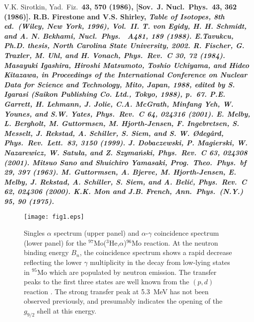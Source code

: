 \begin{multicols}{2}
\begin{references}
V.K. Sirotkin, Yad.\ Fiz.\ \bf 43\rm, 570 (1986), [Sov.\ J. 
Nucl.\ Phys.\ \bf 43\rm, 362 (1986)].
R.B. Firestone and V.S. Shirley, \sl Table of Isotopes\rm, 8th 
ed.\ (Wiley, New York, 1996), Vol.\ II.
T. von Egidy, H. H. Schmidt, and A. N. Bekhami, Nucl.\ Phys.\ \bf
A481\rm, 189 (1988).
E.Tavukcu, Ph.D. thesis, North Carolina State University, 2002.
R. Fischer, G. Traxler, M. Uhl, and H. Vonach, Phys.\ Rev.\ C \bf
30\rm, 72 (1984).
Masayuki Igashira, Hiroshi Matsumoto, Toshio Uchiya\-ma, and 
Hideo Kitazawa, in \sl Proceedings of the International Conference on Nuclear 
Data for Science and Technology\rm, Mito, Japan, 1988, edited by S. Igarasi 
(Saikon Publishing Co. Ltd., Tokyo, 1988), p.\ 67.
P.E. Garrett, H. Lehmann, J. Jolie, C.A. McGrath, Minfang Yeh, W.
Younes, and S.W. Yates, Phys.\ Rev.\ C \bf 64\rm, 024316 (2001).
E. Melby, L. Bergholt, M. Guttormsen, M. Hjorth-Jensen, F. 
Ingebretsen, S. Messelt, J. Rekstad, A. Schiller, S. Siem, and S. W. 
{\O}deg{\aa}rd, Phys.\ Rev.\ Lett.\ \bf 83\rm, 3150 (1999).
J. Dobaczewski, P. Magierski, W. Nazarewicz, W. Satu{\l}a, and Z.
Szyma{\'n}ski, Phys.\ Rev.\ C \bf 63\rm, 024308 (2001).
Mitsuo Sano and Shuichiro Yamasaki, Prog.\ Theo.\ Phys.\ bf 
29\rm, 397 (1963).
M. Guttormsen, A. Bjerve, M. Hjorth-Jensen, E. Melby, J. Rekstad,
A. Schiller, S. Siem, and A. Beli{\'c}, Phys.\ Rev.\ C \bf 62\rm, 024306 
(2000).
K.K. Mon and J.B. French, Ann.\ Phys.\ (N.Y.) \bf 95\rm, 90 
(1975).




\end{references}

\end{multicols}

\clearpage

\begin{figure}\centering
\texttt{[image: fig1.eps]}
\caption{Singles $\alpha$ spectrum (upper panel) and $\alpha$-$\gamma$ 
coincidence spectrum (lower panel) for the $^{97}$Mo($^3$He,$\alpha$)$^{96}$Mo 
reaction. At the neutron binding energy $B_n$, the coincidence spectrum shows a
rapid decrease reflecting the lower $\gamma$ multiplicity in the decay from 
low-lying states in $^{95}$Mo which are populated by neutron emission. The 
transfer peaks to the first three states are well known from the $(p,d)$ 
reaction \protect\cite{CM73}. The strong transfer peak at 5.3~MeV has not been 
observed previously, and presumably indicates the opening of the $g_{9/2}$ 
shell at this energy.}
\label{fig:moraw}
\end{figure}

